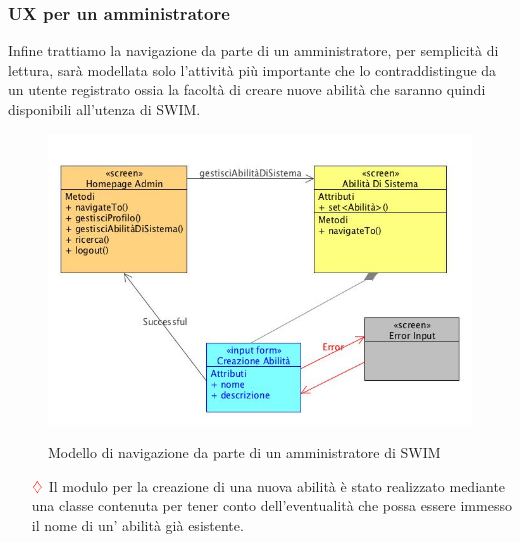 \subsubsection{UX per un amministratore}

Infine trattiamo la navigazione da parte di un amministratore, per semplicità di lettura, sarà modellata solo l'attività più importante che lo contraddistingue da un utente registrato ossia la facoltà di creare nuove abilità che saranno quindi disponibili all'utenza di SWIM.

\begin{figure} [!hbtp]
\centering
\includegraphics[scale=0.40]{uxEsperienzaAmministratore.jpg} \\
\caption{\label{uxAmministratore} Modello di navigazione da parte di un amministratore di SWIM}
\end{figure}

\begin{itemize}
\item[$\textcolor{red}{\diamondsuit}$] Il modulo per la creazione di una nuova abilità è stato realizzato mediante una classe contenuta per tener conto dell'eventualità che possa essere immesso il nome di un' abilità già esistente.
\end{itemize}
